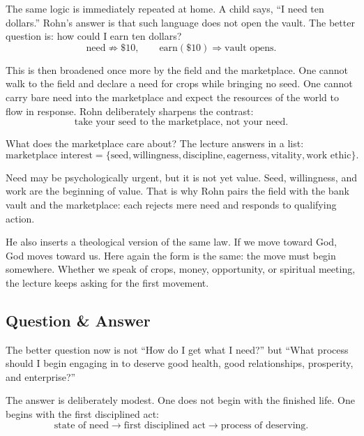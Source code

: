 The same logic is immediately repeated at home. A child says, ``I need ten dollars.'' Rohn's answer is that such language does not open the vault. The better question is: how could I earn ten dollars?
\begin{equation}
\text{need} \not\Rightarrow \$10, \qquad \text{earn}(\$10) \Rightarrow \text{vault opens}.
\end{equation}

This is then broadened once more by the field and the marketplace. One cannot walk to the field and declare a need for crops while bringing no seed. One cannot carry bare need into the marketplace and expect the resources of the world to flow in response. Rohn deliberately sharpens the contrast:
\begin{equation}
\text{take your seed to the marketplace, not your need}.
\end{equation}

What does the marketplace care about? The lecture answers in a list:
\begin{equation}
\text{marketplace interest}
=
\{\text{seed},\text{willingness},\text{discipline},\text{eagerness},\text{vitality},\text{work ethic}\}.
\end{equation}

Need may be psychologically urgent, but it is not yet value. Seed, willingness, and work are the beginning of value. That is why Rohn pairs the field with the bank vault and the marketplace: each rejects mere need and responds to qualifying action.

He also inserts a theological version of the same law. If we move toward God, God moves toward us. Here again the form is the same: the move must begin somewhere. Whether we speak of crops, money, opportunity, or spiritual meeting, the lecture keeps asking for the first movement.

\subsection{Question \& Answer}

The better question now is not ``How do I get what I need?'' but ``What process should I begin engaging in to deserve good health, good relationships, prosperity, and enterprise?''

The answer is deliberately modest. One does not begin with the finished life. One begins with the first disciplined act:
\begin{equation}
\text{state of need} \rightarrow \text{first disciplined act} \rightarrow \text{process of deserving}.
\end{equation}

